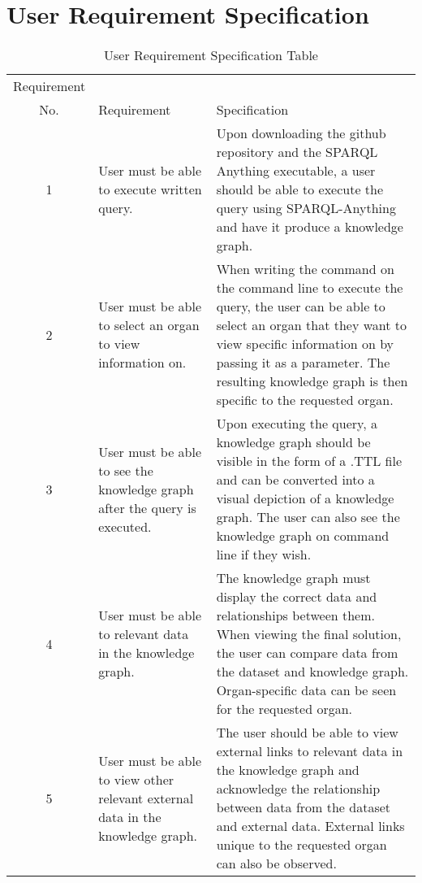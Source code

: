 \begin{table}[h!]
\section{User Requirement Specification}
\begin{center}
\caption{User Requirement Specification Table}
\begin{tabular}{c|p{2in}p{2.55in}}
Requirement \\ No.&Requirement&Specification\\\hline 

1&
User must be able to execute written query. & 
Upon downloading the github repository and the SPARQL Anything executable, a user should be able to execute the query using SPARQL-Anything and have it produce a knowledge graph. \\
\hline

2& 
User must be able to select an organ to view information on. &
When writing the command on the command line to execute the query, the user can be able to select an organ that they want to view specific information on by passing it as a parameter. The resulting knowledge graph is then specific to the requested organ. \\
\hline

3&
User must be able to see the knowledge graph after the query is executed. &
Upon executing the query, a knowledge graph should be visible in the form of a .TTL file and can be converted into a visual depiction of a knowledge graph. The user can also see the knowledge graph on command line if they wish.\\
\hline

4&
User must be able to relevant data in the knowledge graph. & 
The knowledge graph must display the correct data and relationships between them. When viewing the final solution, the user can compare data from the dataset and knowledge graph. Organ-specific data can be seen for the requested organ.\\
\hline

5&
User must be able to view other relevant external data in the knowledge graph. & 
The user should be able to view external links to relevant data in the knowledge graph and acknowledge the relationship between data from the dataset and external data. External links unique to the requested organ can also be observed. 

\end{tabular}
\end{center}
\end{table}

